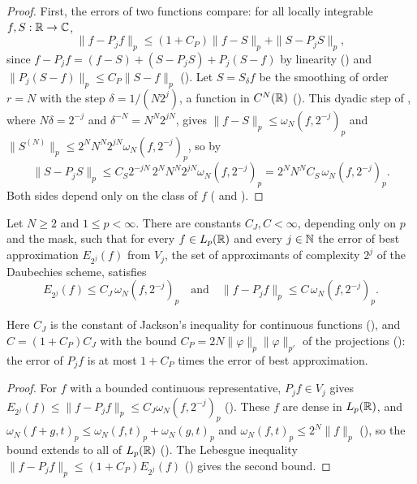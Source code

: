 \begin{proof}
\leanok
{}
First, the errors of two functions compare: for all locally integrable $f, S : \mathbb{R} \to \mathbb{C}$,
\[
  \|f - P_j f\|_p \leq (1 + C_P) \|f - S\|_p + \|S - P_j S\|_p ,
\]
since $f - P_j f = (f - S) + (S - P_j S) + P_j(S - f)$ by linearity
() and $\|P_j(S - f)\|_p \leq C_P \|S - f\|_p$
(). Let $S = S_\delta f$ be the smoothing of order $r = N$ with the
step $\delta = 1/(N 2^j)$, a function in $C^N(\mathbb{R})$ (). This dyadic
step of , where $N\delta = 2^{-j}$ and $\delta^{-N} = N^N 2^{jN}$,
gives $\|f - S\|_p \leq \omega_N(f, 2^{-j})_p$ and
$\|S^{(N)}\|_p \leq 2^N N^N 2^{jN} \omega_N(f, 2^{-j})_p$, so by 
\[
  \|S - P_j S\|_p \leq C_S 2^{-jN} \, 2^N N^N 2^{jN} \omega_N(f, 2^{-j})_p
  = 2^N N^N C_S \, \omega_N(f, 2^{-j})_p .
\]
Both sides depend only on the class of $f$ ( and
).
\end{proof}

\begin{theorem}
\label{thm:daub-jackson}
\leanok
{}
Let $N \geq 2$ and $1 \leq p < \infty$. There are constants $C_J, C < \infty$, depending only on
$p$ and the mask, such that for every $f \in L_p(\mathbb{R})$ and every $j \in \mathbb{N}$ the error of best
approximation $E_{2^j}(f)$ from $V_j$, the set of approximants of complexity $2^j$ of the
Daubechies scheme, satisfies
\[
  E_{2^j}(f) \leq C_J \, \omega_N(f, 2^{-j})_p
  \quad\text{and}\quad
  \|f - P_j f\|_p \leq C \, \omega_N(f, 2^{-j})_p .
\]
\end{theorem}

Here $C_J$ is the constant of Jackson's inequality for continuous functions
(), and $C = (1 + C_P) C_J$ with the bound
$C_P = 2N \|\varphi\|_p \|\varphi\|_{p'}$ of the projections (): the
error of $P_j f$ is at most $1 + C_P$ times the error of best approximation.

\begin{proof}
\leanok
{}
For $f$ with a bounded continuous representative, $P_j f \in V_j$ gives
$E_{2^j}(f) \leq \|f - P_j f\|_p \leq C_J \omega_N(f, 2^{-j})_p$
(). These $f$ are dense in $L_p(\mathbb{R})$, and
$\omega_N(f + g, t)_p \leq \omega_N(f, t)_p + \omega_N(g, t)_p$ and
$\omega_N(f, t)_p \leq 2^N \|f\|_p$ (), so the bound extends to all of
$L_p(\mathbb{R})$ (). The Lebesgue inequality
$\|f - P_j f\|_p \leq (1 + C_P) E_{2^j}(f)$ () gives the second bound.
\end{proof}


